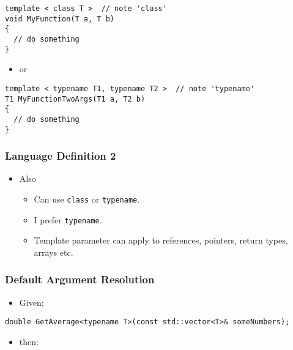 \begin{verbatim}
template < class T >  // note 'class'
void MyFunction(T a, T b)
{
  // do something
}
\end{verbatim}

\begin{itemize}
\itemsep1pt\parskip0pt
\item
  or
\end{itemize}

\begin{verbatim}
template < typename T1, typename T2 >  // note 'typename'
T1 MyFunctionTwoArgs(T1 a, T2 b)
{
  // do something
}
\end{verbatim}

\subsubsection{Language Definition 2}\label{language-definition-2}

\begin{itemize}
\itemsep1pt\parskip0pt
\item
  Also

  \begin{itemize}
  \itemsep1pt\parskip0pt
  \item
    Can use \texttt{class} or \texttt{typename}.
  \item
    I prefer \texttt{typename}.
  \item
    Template parameter can apply to references, pointers, return types,
    arrays etc.
  \end{itemize}
\end{itemize}

\subsubsection{Default Argument
Resolution}\label{default-argument-resolution}

\begin{itemize}
\itemsep1pt\parskip0pt
\item
  Given:
\end{itemize}

\begin{verbatim}
double GetAverage<typename T>(const std::vector<T>& someNumbers);
\end{verbatim}

\begin{itemize}
\itemsep1pt\parskip0pt
\item
  then:
\end{itemize}

